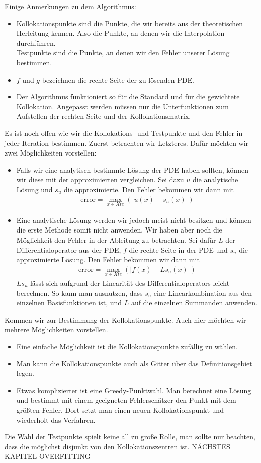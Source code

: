 Einige Anmerkungen zu dem Algorithmus:
\begin{itemize}
\item
Kollokationspunkte sind die Punkte, die wir bereits aus der theoretischen Herleitung kennen. Also die Punkte, an denen wir die Interpolation durchführen.\\
Testpunkte sind die Punkte, an denen wir den Fehler unserer Lösung bestimmen.
\item
$f$ und $g$ bezeichnen die rechte Seite der zu lösenden \gls{PDE}.
\item
Der Algorithmus funktioniert so für die Standard und für die gewichtete Kollokation. Angepasst werden müssen nur die Unterfunktionen zum Aufstellen der rechten Seite und der Kollokationsmatrix.
\end{itemize}
Es ist noch offen wie wir die Kollokations- und Testpunkte und den Fehler in jeder Iteration bestimmen. Zuerst betrachten wir Letzteres. Dafür möchten wir zwei Möglichkeiten vorstellen:
\begin{itemize}
\item
Falls wir eine analytisch bestimmte Lösung der \gls{PDE} haben sollten, können wir diese mit der approximierten vergleichen. Sei dazu $u$ die analytische Lösung und $s_u$ die approximierte. Den Fehler bekommen wir dann mit
\begin{align*}
\mathrm{error} = \max_{x \in Xte} \left(\left| u(x) - s_u(x) \right| \right)
\end{align*}
\item
Eine analytische Lösung werden wir jedoch meist nicht besitzen und können die erste Methode somit nicht anwenden. Wir haben aber noch die Möglichkeit den Fehler in der Ableitung zu betrachten. Sei dafür $L$ der Differentialoperator aus der \gls{PDE}, $f$ die rechte Seite in der \gls{PDE} und $s_u$ die approximierte Lösung. Den Fehler bekommen wir dann mit
\begin{align*}
\mathrm{error} = \max_{x \in Xte} \left(\left| f(x) - L s_u(x) \right| \right)
\end{align*}
$Ls_u$ lässt sich aufgrund der Linearität des Differentialoperators leicht berechnen. So kann man ausnutzen, dass $s_u$ eine Linearkombination aus den einzelnen Basisfunktionen ist, und $L$ auf die einzelnen Summanden anwenden.
\end{itemize}

Kommen wir zur Bestimmung der Kollokationspunkte. Auch hier möchten wir mehrere Möglichkeiten vorstellen.
\begin{itemize}
\item
Eine einfache Möglichkeit ist die Kollokationspunkte zufällig zu wählen.
\item
Man kann die Kollokationspunkte auch als Gitter über das Definitionsgebiet legen.
\item
Etwas komplizierter ist eine Greedy-Punktwahl. Man berechnet eine Lösung und bestimmt mit einem geeigneten Fehlerschätzer den Punkt mit dem größten Fehler. Dort setzt man einen neuen Kollokationspunkt und wiederholt das Verfahren.
\end{itemize}

Die Wahl der Testpunkte spielt keine all zu große Rolle, man sollte nur beachten, dass die möglichst disjunkt von den Kollokationszentren ist. NÄCHSTES KAPITEL OVERFITTING